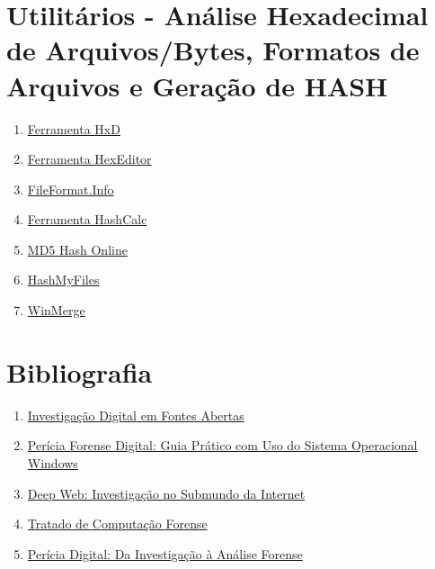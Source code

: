 \documentclass{article}
\begin{document}
\section{Utilitários - Análise Hexadecimal de Arquivos/Bytes, Formatos de Arquivos e Geração de HASH}
\begin{enumerate}
\item \href{https://mh-nexus.de/en/hxd/}{Ferramenta HxD}
\item \href{https://hexeditor.en.softonic.com/}{Ferramenta HexEditor}
\item \href{https://www.fileformat.info/index.htm}{FileFormat.Info}
\item \href{https://www.slavasoft.com/hashcalc/}{Ferramenta HashCalc}
\item \href{https://md5file.com/calculator}{MD5 Hash Online}
\item \href{https://www.nirsoft.net/utils/hash_my_files.html}{HashMyFiles}
\item \href{https://winmerge.org/downloads/?lang=pt_br}{WinMerge}
\end{enumerate}
\section{Bibliografia}
\begin{enumerate}
\item \href{https://www.amazon.com.br/Investiga%C3%A7%C3%A3o-Digital-em-Fontes-Abertas/dp/8574528145}{Investigação Digital em Fontes Abertas}
\item \href{https://www.amazon.com.br/Per%C3%ADcia-Forense-Digital-Pr%C3%A1tico-Operacional/dp/8575227920}{Perícia Forense Digital: Guia Prático com Uso do Sistema Operacional Windows}
\item \href{https://www.amazon.com.br/Deep-Web-Investiga%C3%A7%C3%A3o-Submundo-Internet/dp/8574529370/ref=pd_lpo_3?pd_rd_i=8574529370&psc=1}{Deep Web: Investigação no Submundo da Internet}
\item \href{https://www.amazon.com.br/Tratado-Computa%C3%A7%C3%A3o-Forense-Jesus-Antonio/dp/8576253356/ref=asc_df_8576253356/?hvadid=379787347388&hvpos=&hvnetw=g&hvrand=3143330243853780134&hvpone=&hvptwo=&hvqmt=&hvdev=c&hvdvcmdl=&hvlocint=&hvlocphy=9101232&hvtargid=pla-397665041735&psc=1}{Tratado de Computação Forense}
\item \href{https://www.amazon.com.br/Per%C3%ADcia-Digital-Investiga%C3%A7%C3%A3o-An%C3%A1lise-Forense/dp/8576253704/ref=asc_df_8576253704/?hvadid=379765738259&hvpos=&hvnetw=g&hvrand=3143330243853780134&hvpone=&hvptwo=&hvqmt=&hvdev=c&hvdvcmdl=&hvlocint=&hvlocphy=9101232&hvtargid=pla-809950589249&psc=1}{Perícia Digital: Da Investigação à Análise Forense}
\end{enumerate}
\end{document}
